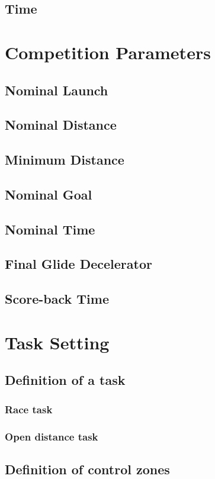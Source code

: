 \documentclass{article}
\begin{document}
\subsection{Time}

\newpage
\section{Competition Parameters}
\subsection{Nominal Launch}
\subsection{Nominal Distance}
\subsection{Minimum Distance}
\subsection{Nominal Goal}
\subsection{Nominal Time}
\subsection{Final Glide Decelerator}
\subsection{Score-back Time}

\newpage
\section{Task Setting}
\subsection{Definition of a task}
\subsubsection{Race task}
\subsubsection{Open distance task}
\subsection{Definition of control zones}
\end{document}

